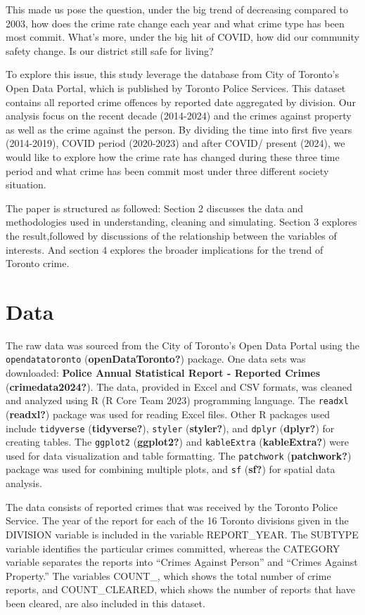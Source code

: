 \documentclass[
  letterpaper,
  DIV=11,
  numbers=noendperiod]{scrartcl}
\begin{document}
This made us pose the question, under the big trend of decreasing
compared to 2003, how does the crime rate change each year and what
crime type has been most commit. What's more, under the big hit of
COVID, how did our community safety change. Is our district still safe
for living?

To explore this issue, this study leverage the database from City of
Toronto's Open Data Portal, which is published by Toronto Police
Services. This dataset contains all reported crime offences by reported
date aggregated by division. Our analysis focus on the recent decade
(2014-2024) and the crimes against property as well as the crime against
the person. By dividing the time into first five years (2014-2019),
COVID period (2020-2023) and after COVID/ present (2024), we would like
to explore how the crime rate has changed during these three time period
and what crime has been commit most under three different society
situation.

The paper is structured as followed: Section 2 discusses the data and
methodologies used in understanding, cleaning and simulating. Section 3
explores the result,followed by discussions of the relationship between
the variables of interests. And section 4 explores the broader
implications for the trend of Toronto crime.

\hypertarget{sec-data}{%
\section{Data}\label{sec-data}}

The raw data was sourced from the City of Toronto's Open Data Portal
using the \texttt{opendatatoronto} (\textbf{openDataToronto?}) package.
One data sets was downloaded: \textbf{Police Annual Statistical Report -
Reported Crimes} (\textbf{crimedata2024?}). The data, provided in Excel
and CSV formats, was cleaned and analyzed using R (R Core Team 2023)
programming language. The \texttt{readxl} (\textbf{readxl?}) package was
used for reading Excel files. Other R packages used include
\texttt{tidyverse} (\textbf{tidyverse?}), \texttt{styler}
(\textbf{styler?}), and \texttt{dplyr} (\textbf{dplyr?}) for creating
tables. The \texttt{ggplot2} (\textbf{ggplot2?}) and \texttt{kableExtra}
(\textbf{kableExtra?}) were used for data visualization and table
formatting. The \texttt{patchwork} (\textbf{patchwork?}) package was
used for combining multiple plots, and \texttt{sf} (\textbf{sf?}) for
spatial data analysis.

The data consists of reported crimes that was received by the Toronto
Police Service. The year of the report for each of the 16 Toronto
divisions given in the DIVISION variable is included in the variable
REPORT\_YEAR. The SUBTYPE variable identifies the particular crimes
committed, whereas the CATEGORY variable separates the reports into
``Crimes Against Person'' and ``Crimes Against Property.'' The variables
COUNT\_, which shows the total number of crime reports, and
COUNT\_CLEARED, which shows the number of reports that have been
cleared, are also included in this dataset.
\end{document}
